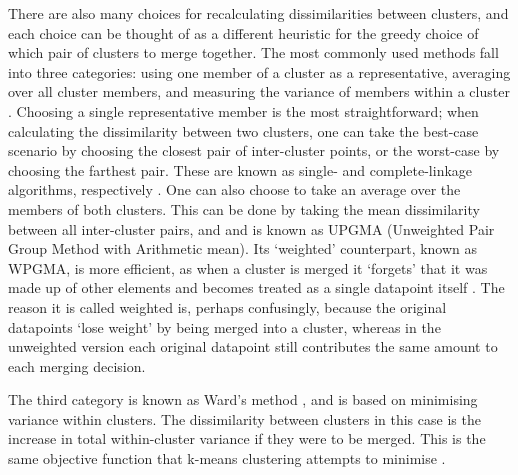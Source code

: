 There are also many choices for recalculating dissimilarities between clusters, and each choice can be thought of as a different heuristic for the greedy choice of which pair of clusters to merge together.
The most commonly used methods fall into three categories: using one member of a cluster as a representative, averaging over all cluster members, and measuring the variance of members within a cluster \citep{Roux2018}.
Choosing a single representative member is the most straightforward; when calculating the dissimilarity between two clusters, one can take the best-case scenario by choosing the closest pair of inter-cluster points, or the worst-case by choosing the farthest pair. These are known as single- and complete-linkage algorithms, respectively \citep{Sibson1973, Defays1977}.
One can also choose to take an average over the members of both clusters. This can be done by taking the mean dissimilarity between all inter-cluster pairs, and and is known as UPGMA (Unweighted Pair Group Method with Arithmetic mean). Its `weighted' counterpart, known as WPGMA, is more efficient, as when a cluster is merged it `forgets' that it was made up of other elements and becomes treated as a single datapoint itself \citep{Sneath1973}. The reason it is called weighted is, perhaps confusingly, because the original datapoints `lose weight' by being merged into a cluster, whereas in the unweighted version each original datapoint still contributes the same amount to each merging decision.

The third category is known as Ward's method \citep{WardJr1963}, and is based on minimising variance within clusters. The dissimilarity between clusters in this case is the increase in total within-cluster variance if they were to be merged. This is the same objective function that k-means clustering attempts to minimise \citep{Friedman2001Nearest}.

